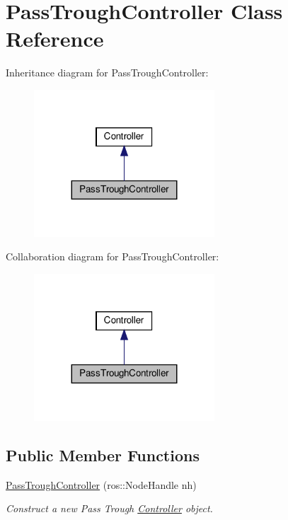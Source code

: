 \hypertarget{classPassTroughController}{}\section{Pass\+Trough\+Controller Class Reference}
\label{classPassTroughController}


Inheritance diagram for Pass\+Trough\+Controller\+:\nopagebreak
\begin{figure}[H]
\begin{center}
\leavevmode
\includegraphics[width=191pt]{dc/de8/classPassTroughController__inherit__graph}
\end{center}
\end{figure}


Collaboration diagram for Pass\+Trough\+Controller\+:\nopagebreak
\begin{figure}[H]
\begin{center}
\leavevmode
\includegraphics[width=191pt]{d5/d84/classPassTroughController__coll__graph}
\end{center}
\end{figure}
\subsection*{Public Member Functions}
\begin{DoxyCompactItemize}
\item 
\hyperlink{classPassTroughController_ab07ab9e0032dd1a46f3fd80726ce4b1f}{Pass\+Trough\+Controller} (ros\+::\+Node\+Handle nh)
\begin{DoxyCompactList}\small\item\em Construct a new Pass Trough \hyperlink{classController}{Controller} object. \end{DoxyCompactList}\end{DoxyCompactItemize}
